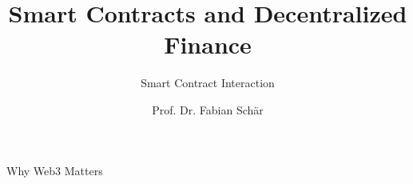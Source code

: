 \documentclass[]{beamer}
\title{Smart Contracts and Decentralized Finance}
\subtitle{Smart Contract Interaction}
\author{Prof. Dr. Fabian Schär}
\institute{University of Basel}
\begin{document}
\thispagestyle{empty}
\begin{frame}[noframenumbering]
	\titlepage
\end{frame}

\begin{frame}{Why Web3 Matters}
\begin{center}
	
\end{center}
\end{frame}
\end{document}
